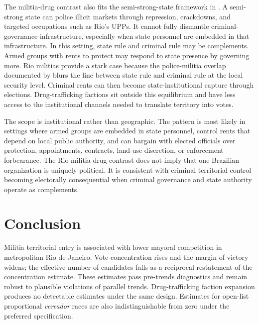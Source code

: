 \documentclass[11pt]{article}
\begin{document}
The militia-drug contrast also fits the semi-strong-state framework in \citet{blattman2025gangrule}. A semi-strong state can police illicit markets through repression, crackdowns, and targeted occupations such as Rio's UPPs. It cannot fully dismantle criminal-governance infrastructure, especially when state personnel are embedded in that infrastructure. In this setting, state rule and criminal rule may be complements. Armed groups with rents to protect may respond to state presence by governing more. Rio militias provide a stark case because the police-militia overlap documented by \citet{pantaleao2025elections} blurs the line between state rule and criminal rule at the local security level. Criminal rents can then become state-institutional capture through elections. Drug-trafficking factions sit outside this equilibrium and have less access to the institutional channels needed to translate territory into votes.

The scope is institutional rather than geographic. The pattern is most likely in settings where armed groups are embedded in state personnel, control rents that depend on local public authority, and can bargain with elected officials over protection, appointments, contracts, land-use discretion, or enforcement forbearance. The Rio militia-drug contrast does not imply that one Brazilian organization is uniquely political. It is consistent with criminal territorial control becoming electorally consequential when criminal governance and state authority operate as complements.

\section{Conclusion}\label{sec:conclusion}

Militia territorial entry is associated with lower mayoral competition in metropolitan Rio de Janeiro. Vote concentration rises and the margin of victory widens; the effective number of candidates falls as a reciprocal restatement of the concentration estimate. These estimates pass pre-trends diagnostics and remain robust to plausible violations of parallel trends. Drug-trafficking faction expansion produces no detectable estimates under the same design. Estimates for open-list proportional \emph{vereador} races are also indistinguishable from zero under the preferred specification.
\end{document}
